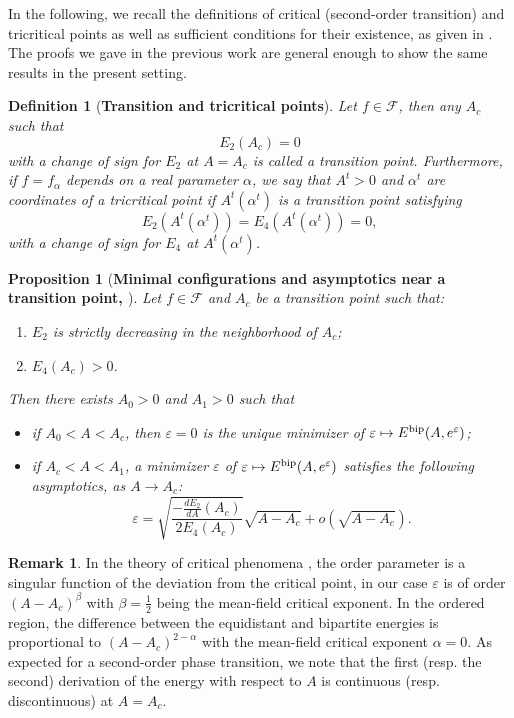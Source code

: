 \documentclass[12pt]{iopart}
\newtheorem{defi}{Definition}[section]
\newtheorem{prop}[thm]{Proposition}
\theoremstyle{definition}
\newtheorem{remark}[thm]{Remark}
\begin{document}
In the following, we recall the definitions of critical
(second-order transition) and tricritical points as well as sufficient
conditions for their existence, as given in \cite{Betermin24}.
The proofs we gave in the previous work are general enough
to show the same results in the present setting.

\begin{defi}[\textbf{Transition and tricritical points}]
Let $f\in \mathcal{F}$, then any $A_c$ such that
$$
E_2(A_c)=0
$$
with a change of sign for $E_2$ at $A=A_c$ is called a transition point.
Furthermore, if $f=f_\alpha$ depends on a real parameter $\alpha$,
we say that $A^t>0$ and $\alpha^t$ are coordinates of a tricritical point
if $A^t(\alpha^t)$ is a transition point satisfying
$$
E_2(A^t(\alpha^t))=E_4(A^t(\alpha^t))=0,
$$
with a change of sign for $E_4$ at $A^t(\alpha^t)$.
\end{defi}

\begin{prop}[\textbf{Minimal configurations and asymptotics near a transition point, \cite{Betermin24}}] \label{prop:exp}
Let $f\in \mathcal{F}$ and $A_c$ be a transition point such that:
\begin{enumerate}
\item[(1)] $E_2$ is strictly decreasing in the neighborhood of $A_c$;
\item[(2)] $E_4(A_c)>0$.
\end{enumerate}
Then there exists $A_0>0$ and $A_1>0$ such that
\begin{itemize}
\item[•] if $A_0<A<A_c$, then $\varepsilon=0$ is the unique minimizer of
$\varepsilon\mapsto E^{\rm bip}(A,e^{\varepsilon})$;
\item[•] if $A_c<A<A_1$, a minimizer $\varepsilon$ of
$\varepsilon\mapsto E^{\rm bip}(A,e^{\varepsilon})$ satisfies the following
asymptotics, as $A\to A_c$:
\begin{equation}\label{nontrivialeps}
\varepsilon=\sqrt{\frac{-\frac{d E_2}{d A}(A_c)}{2E_4(A_c)}}\sqrt{A-A_c}
+ o(\sqrt{A-A_c}).
\end{equation}
\end{itemize}
\end{prop}

\begin{remark}
In the theory of critical phenomena \cite{Baxter07,Samaj13}, the
order parameter is a singular function of the deviation from the critical
point, in our case $\varepsilon$ is of order $(A-A_c)^{\beta}$ with $\beta=\frac{1}{2}$
being the mean-field critical exponent.
In the ordered region, the difference between the equidistant and
bipartite energies is proportional to
$(A-A_c)^{2-\alpha}$ with the mean-field critical exponent $\alpha=0$.
As expected for a second-order phase transition, we note that the first (resp. the second) derivation of the energy with respect to $A$ is continuous (resp. discontinuous) at $A=A_c$.
\end{remark}
\end{document}
